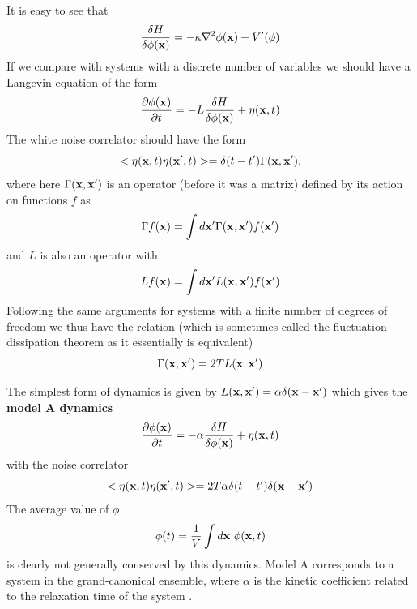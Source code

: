 It is easy to see that 
\begin{equation}
\frac{\delta H}{\delta \phi({\bf x})} = -\kappa \nabla^2 \phi({\bf x}) + V'(\phi)
\label{cm}
\end{equation}
If we compare with systems with a discrete number of variables we
should have a Langevin equation of the form
\begin{equation}
\frac{\partial \phi({\bf x})}{\partial t}= -L \frac{\delta H}{\delta \phi({\bf x})} + \eta({\bf x},t)
\end{equation}
The white noise correlator should have the form
\begin{equation}
< \eta({\bf x},t)\eta({\bf x}',t)> =\delta(t-t')\Gamma({\bf x},{\bf x'}),
\end{equation}
where here $\Gamma({\bf x},{\bf x'})$ is an operator (before it was a matrix) defined by its action on functions $f$ as
\begin{equation}
\Gamma f({\bf x}) = \int d{\bf x}' \Gamma({\bf x},{\bf x}')f({\bf x}')
\end{equation}
and $L$ is also an operator with 
\begin{equation}
L f({\bf x}) = \int d{\bf x}' L({\bf x},{\bf x}')f({\bf x}')
\end{equation}
Following the same arguments for systems with a finite number of degrees of freedom we thus have the relation (which is sometimes called the fluctuation dissipation theorem as it essentially is equivalent)
\begin{equation} 
\Gamma({\bf x},{\bf x}') =2T L({\bf x},{\bf x}')
\label{gnoise}
\end{equation}

The simplest form of dynamics is given by $L({\bf x},{\bf x}')=\alpha\delta({\bf x}-{\bf x}')$ which gives the \textbf{model A dynamics}
\begin{equation}
\frac{\partial \phi({\bf x})}{\partial t}= -\alpha \frac{\delta H}{\delta \phi({\bf x})} + \eta({\bf x},t) 
\label{MA}
\end{equation}
with the noise correlator
\begin{equation}
< \eta({\bf x},t)\eta({\bf x}',t)> =2T \alpha \delta(t-t')\delta({\bf x}-{\bf x'})
\end{equation}
The average value of $\phi$ 
\begin{equation}
\overline \phi(t) = \frac{1}{V}\int d\bx\ \phi(\bx,t)
\end{equation}
is clearly not generally conserved by this dynamics. Model A corresponds to a system in the grand-canonical ensemble, where $\alpha$ is the kinetic coefficient related to the relaxation time of the system \cite{hohenberg_theory_1977}.

